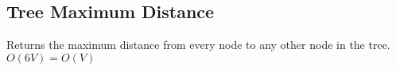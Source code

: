 \subsection{Tree Maximum Distance}
Returns the maximum distance from every node to any other node in the tree.
$O(6V) = O(V)$
